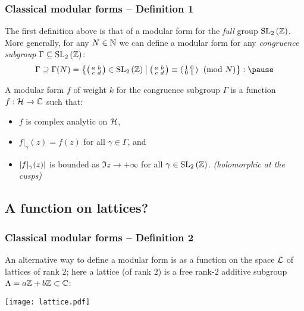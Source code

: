 \begin{frame} \frametitle{Classical modular forms -- Definition 1}
  The first definition above is that of a modular form for the \emph{full} group $\SL[2]{\ZZ}$.
  More generally, for any $N \in \NN$ we can define a modular form for any \emph{congruence subgroup} $\Gamma \subseteq \SL[2]{\ZZ}$:
  \[ \Gamma \supseteq \Gamma(N) = \setst{\parens{\begin{smallmatrix} a & b \\ c & d \end{smallmatrix}} \in \SL[2]{\ZZ}}{\parens{\begin{smallmatrix} a & b \\ c & d \end{smallmatrix}} \equiv \parens{\begin{smallmatrix} 1 & 0 \\ 0 & 1 \end{smallmatrix}} \pmod{N}}: \pause \]
  \begin{definition}
    A modular form $f$ of weight $k$ for the congruence subgroup $\Gamma$ is a function $f : \HH \to \CC$ such that: \pause
    \begin{itemize}
      \item $f$ is complex analytic on $\HH$\pause,
      \item $f|_\gamma(z) = f(z)$ for all $\gamma \in \Gamma$\pause, and
      \item $\abs{f|_\gamma(z)}$ is bounded as $\Im{z} \to +\infty$ for all $\gamma \in \SL[2]{\ZZ}$. \pause \hfill \emph{(holomorphic at the cusps)}
    \end{itemize}
  \end{definition} \pause

\end{frame}


\subsection{A function on lattices?}

\begin{frame} \frametitle{Classical modular forms -- Definition 2}
  An alternative way to define a modular form is as a function on the space $\LL$ of lattices of rank $2$\pause; here a lattice (of rank $2$) is a free rank-$2$ additive subgroup $\Lambda = a\ZZ +b\ZZ \subset \CC$:\pause

  \texttt{[image: lattice.pdf]}
\end{frame}


